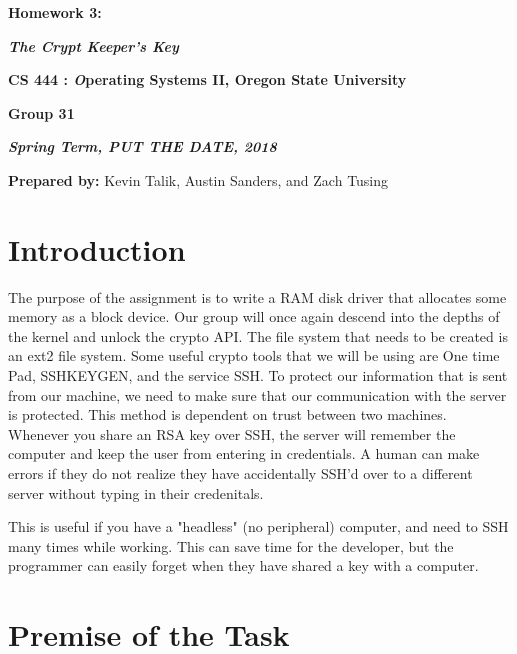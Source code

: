 \documentclass[onecolumn, draftclsnofoot,10pt, compsoc]{IEEEtran}
\def \GroupMemberOne{			Kevin Talik}
\def \GroupMemberTwo{			Austin Sanders}
\def \GroupMemberThree{			Zach Tusing}
\begin{document}
 	\begin{center}
	\huge\bf{ Homework 3:} 
   
    \large\textbf{\textit{ The Crypt Keeper's Key }}\par
     
    
    
	\small{\bf CS 444 : \textit Operating Systems II, Oregon State University}\par
    \small{\bf{Group 31}}
    
    
    {\bf\textit{ Spring Term, PUT THE DATE, 2018} }
    
    
    {\small {\bf Prepared by:} \GroupMemberOne, \GroupMemberTwo, and \GroupMemberThree }
        \end{center}
 		\vfill

       \pagebreak
       \section{ Introduction}
	The purpose of the assignment is to write a RAM disk driver that allocates some memory as a block device. Our group will once again descend into the depths of the kernel and unlock the crypto API.
	The file system that needs to be created is an ext2 file system. Some useful crypto tools that we will be using are One time Pad, SSHKEYGEN, and the service SSH. To protect our information that is sent from our machine, we need to make sure that our communication with the server is protected. This method is dependent on trust between two machines. 
	Whenever you share an RSA key over SSH, the server will remember the computer and keep the user from entering in credentials.
	A human can make errors if they do not realize they have accidentally SSH'd over to a different server without typing in their credenitals. 

	This is useful if you have a "headless" (no peripheral) computer, and need to SSH many times while working. This can save time for the developer, but the programmer can easily forget when they have shared a key with a computer.
	\section{ Premise of the Task }
	
        
\end{document}
